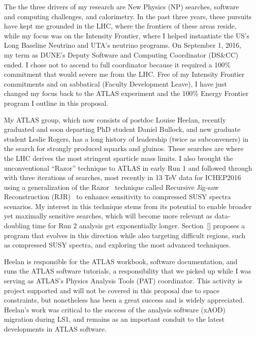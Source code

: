 
The the three drivers of my research are New Physics (NP) searches,
software and computing challenges, and calorimetry. In the past three
years, these pursuits have kept me grounded in the LHC, where the
frontiers of these areas reside, while my focus was on the Intensity
Frontier, where I helped instantiate the US's Long Baseline
Neutrino and UTA's neutrino programs. On September 1, 2016, my term as
DUNE's Deputy Software and Computing Coordinator (DS\&CC) ended. I
chose not to ascend to full coordinator because it required a 100\%
commitment that would severe me from the LHC. Free of my Intensity
Frontier commitments and on sabbatical (Faculty Development Leave), I
have just changed my focus back to the ATLAS experiment and the 100\%
Energy Frontier program I outline in this proposal.

My ATLAS group, which now consists of postdoc Louise Heelan, recently
graduated and soon departing PhD student Daniel Bullock, and new
graduate student Leslie Rogers, has a long history of leadership
(twice as subconveners) in the search for strongly produced squarks
and gluinos. These searches are where the LHC derives the most
stringent sparticle mass limits. I also brought the unconventional
``Razor'' technique to ATLAS in early Run 1 and followed through with
three iterations of searches, most recently in 13 TeV data for
ICHEP2016 using a generalization of the Razor~\cite{} technique called
Recursive Jig-saw Reconstruction (RJR)~\cite{} to enhance sensitivity
to compressed SUSY spectra scenarios. My interest in this technique
stems from its potential to enable broader yet maximally sensitive
searches, which will become more relevant as data-doubling time for
Run 2 analysis get exponentially longer.  Section~\ref{} proposes a
program that evolves in this direction while also targeting difficult
regions, such as compressed SUSY spectra, and exploring the most
advanced techniques.

Heelan is responsible for the ATLAS workbook, software documentation,
and runs the ATLAS software tutorials, a responsibility that we picked
up while I was serving as ATLAS's Physics Analysis Tools (PAT)
coordinator. This activity is project supported and will not be
covered in this proposal due to space constraints, but nonetheless has
been a great success and is widely appreciated. Heelan's work was
critical to the success of the analysis software (xAOD) migration
during LS1, and remains as an important conduit to the latest
developments in ATLAS software. 


